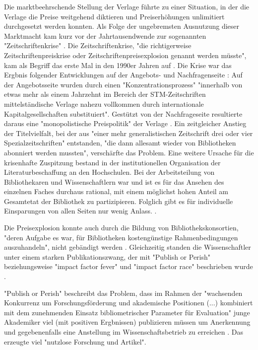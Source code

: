 Die marktbeehrschende Stellung der Verlage führte zu einer Situation, in der die Verlage die Preise weitgehend diktieren und Preiserhöhungen unlimitiert durchgesetzt werden konnten. Als Folge der ungebremsten Ausnutzung dieser Marktmacht kam kurz vor der Jahrtausendwende zur sogenannten "Zeitschriftenkrise" \cite{schirmbacher_2009_wisspub} \cite{muller_2010_open}. Die Zeitschriftenkrise, "die richtigerweise Zeitschriftenpreiskrise oder Zeitschriftenpreisexplosion genannt werden müsste"\cite {Brintzinger_2010}, kam als Begriff das erste Mal in den 1990er Jahren auf \cite{Boni_2010}. Die Krise war das Ergbnis folgender Entwicklungen auf der Angebots- und Nachfragenseite \cite{Brintzinger_2010}: Auf der Angebotsseite wurden durch einen "Konzentrationsprozess" "innerhalb von etwas mehr als einem Jahrzehnt im Bereich der STM-Zeitschriften mittelständische Verlage nahezu vollkommen durch internationale Kapitalgesellschaften substituiert". \cite{Brintzinger_2010} Gestützt von der Nachfrageseite resultierte daraus eine "monopolistische Preispolitik" der Verlage \cite{Brintzinger_2010}. Ein zeitgleicher Anstieg der Titelvielfalt, bei der aus "einer mehr generalistischen Zeitschrift drei oder vier Spezialzeitschriften" entstanden, "die dann allesamt wieder von Bibliotheken abonniert werden mussten"\cite{Brintzinger_2010}, verschärfte das Problem. Eine weitere Ursache für die krisenhafte Zuspitzung bestand in der institutionellen Organisation der Literaturbeschaffung an den Hochschulen. Bei der Arbeitsteilung von Bibliothekaren und Wissenschaftlern war und ist es für das Ansehen des einzelnen Faches durchaus rational, mit einem möglichst hohen Anteil am Gesamtetat der Bibliothek zu partizipieren. Folglich gibt es für individuelle Einsparungen von allen Seiten nur wenig Anlass. \cite{Brintzinger_2010}.

Die Preisexplosion konnte auch durch die Bildung von Bibliothekskonsortien, "deren Aufgabe es war, für Bibliotheken kostengünstige Rahmenbedingungen auszuhandeln", nicht gebändigt werden \cite{Fladung_2003} \cite{Brintzinger_2010}. Gleichzeitig standen die Wissenschaftler unter einem starken Publikationszwang, der mit "Publish or Perish" \cite{CLAPHAM_2005} beziehungsweise "impact factor fever" \cite{Cherubini_2008} und "impact factor race" \cite{Brischoux_2009} beschrieben wurde \cite{offhaus_2012_institutionelle_repos}.  

"Publish or Perish" beschreibt das Problem, dass im Rahmen der "wachsenden Konkurrenz um Forschungsförderung und akademische Positionen (...) kombiniert mit dem zunehmenden Einsatz bibliometrischer Parameter für Evaluation" \cite{Fanelli_2010} junge Akademiker viel (mit positiven Ergbnissen) publizieren müssen um Anerkennung und gegebenenfalls eine Anstellung im Wissenschaftsbetrieb zu erreichen \cite{pscheida_2010_wikipedia} \cite{Beasley_2005}. Das erzeugte viel "nutzlose Forschung und Artikel"\cite{smith1990killing}.

